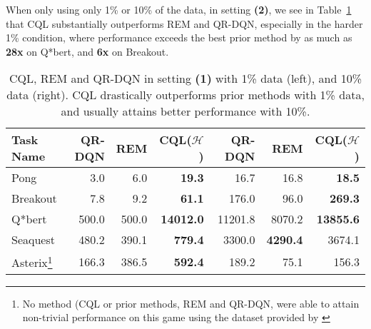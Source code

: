 When only using only 1\% or 10\% of the data, in setting \textbf{(2)}, we see in Table~\ref{table:atari_reduced_size} that CQL substantially outperforms REM and QR-DQN, especially in the harder 1\% condition, where performance exceeds the best prior method by as much as \textbf{28x} on Q*bert, and \textbf{6x} on Breakout.

\begin{table}[h]
    \centering
    \begin{tabular}{l|r|r|r|||r|r|r}
    \hline
        \textbf{Task Name} & \textbf{QR-DQN} & \textbf{REM} & \textbf{CQL($\mathcal{H}$)}  & \textbf{QR-DQN} & \textbf{REM} & \textbf{CQL($\mathcal{H}$)}  \\
        \hline
         Pong & 3.0 & 6.0 & \textbf{19.3} & 16.7 & 16.8 & \textbf{18.5} \\
         Breakout & 7.8 & 9.2 & \textbf{61.1} & 176.0 & 96.0 & \textbf{269.3} \\
         Q*bert & 500.0 & 500.0 & \textbf{14012.0}& 11201.8 & 8070.2 & \textbf{13855.6}\\
         Seaquest & 480.2 & 390.1 & \textbf{779.4} & 3300.0 & \textbf{4290.4} & 3674.1 \\
         Asterix\footnote{No method (CQL or prior methods, REM and QR-DQN, were able to attain non-trivial performance on this game using the dataset provided by \citet{agarwal2019optimistic}} & 166.3 & 386.5 & \textbf{592.4} & 189.2 & 75.1 & 156.3 \\
         \hline
    \end{tabular}
    \caption{{\footnotesize CQL, REM and QR-DQN in setting \textbf{(1)} with 1\% data (left), and 10\% data (right). CQL drastically outperforms prior methods with 1\% data, and usually attains better performance with 10\%.}}
    \label{table:atari_reduced_size}
\end{table}


